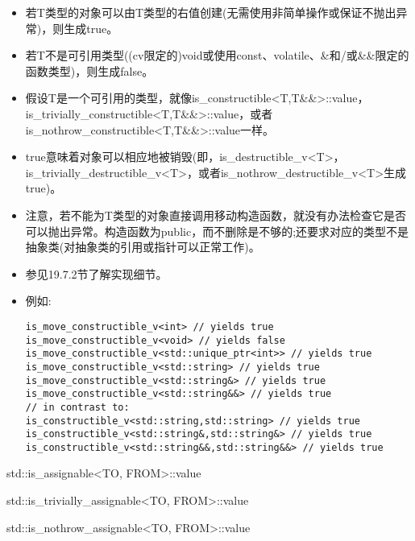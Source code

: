 \begin{itemize}
\item 
若T类型的对象可以由T类型的右值创建(无需使用非简单操作或保证不抛出异常)，则生成true。

\item 
若T不是可引用类型((cv限定的)void或使用const、volatile、\&和/或\&\&限定的函数类型)，则生成false。

\item 
假设T是一个可引用的类型，就像is\_constructible<T,T\&\&>::value，is\_trivially\_constructible<T,T\&\&>::value，或者is\_nothrow\_constructible<T,T\&\&>::value一样。

\item 
true意味着对象可以相应地被销毁(即，is\_destructible\_v<T>，is\_trivially\_destructible\_v<T>，或者is\_nothrow\_destructible\_v<T>生成true)。

\item 
注意，若不能为T类型的对象直接调用移动构造函数，就没有办法检查它是否可以抛出异常。构造函数为public，而不删除是不够的;还要求对应的类型不是抽象类(对抽象类的引用或指针可以正常工作)。

\item 
参见19.7.2节了解实现细节。

\item 
例如:
\begin{lstlisting}[style=styleCXX]
is_move_constructible_v<int> // yields true
is_move_constructible_v<void> // yields false
is_move_constructible_v<std::unique_ptr<int>> // yields true
is_move_constructible_v<std::string> // yields true
is_move_constructible_v<std::string&> // yields true
is_move_constructible_v<std::string&&> // yields true
// in contrast to:
is_constructible_v<std::string,std::string> // yields true
is_constructible_v<std::string&,std::string&> // yields true
is_constructible_v<std::string&&,std::string&&> // yields true
\end{lstlisting}
\end{itemize}

std::is\_assignable<TO, FROM>::value

std::is\_trivially\_assignable<TO, FROM>::value

std::is\_nothrow\_assignable<TO, FROM>::value

